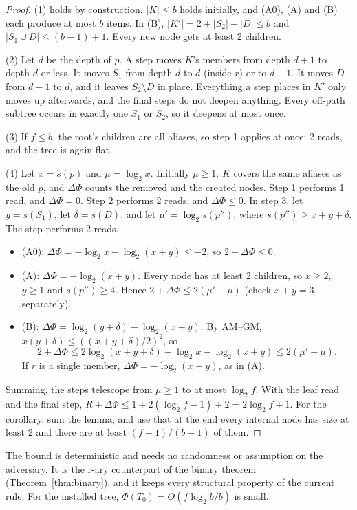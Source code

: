 \documentclass[11pt]{article}
\theoremstyle{definition}
\begin{document}
\begin{proof}
(1) holds by construction. $|K|\le b$ holds initially, and (A0), (A) and (B)
each produce at most $b$ items. In (B), $|K'|=2+|S_2|-|D|\le b$ and
$|S_1\cup D|\le (b-1)+1$. Every new node gets at least 2 children.

(2) Let $d$ be the depth of $p$. A step moves $K$'s members from depth $d+1$
to depth $d$ or less. It moves $S_1$ from depth $d$ to $d$ (inside $r$) or to
$d-1$. It moves $D$ from $d-1$ to $d$, and it leaves $S_2\setminus D$ in
place. Everything a step places in $K'$ only moves up afterwards, and the
final steps do not deepen anything. Every off-path subtree occurs in exactly
one $S_1$ or $S_2$, so it deepens at most once.

(3) If $f\le b$, the root's children are all aliases, so step 1 applies at
once: 2 reads, and the tree is again flat.

(4) Let $x=s(p)$ and $\mu=\log_2 x$. Initially $\mu\ge1$. $K$ covers the same
aliases as the old $p$, and $\Delta\Phi$ counts the removed and the created
nodes. Step 1 performs 1 read, and $\Delta\Phi=0$. Step 2 performs 2 reads,
and $\Delta\Phi\le0$. In step 3, let $y=s(S_1)$, let $\delta=s(D)$, and let
$\mu'=\log_2 s(p'')$, where $s(p'')\ge x+y+\delta$. The step performs 2 reads.
\begin{itemize}
\item (A0): $\Delta\Phi=-\log_2x-\log_2(x+y)\le -2$, so $2+\Delta\Phi\le0$.
\item (A): $\Delta\Phi=-\log_2(x+y)$. Every node has at least 2 children, so
  $x\ge2$, $y\ge1$ and $s(p'')\ge4$. Hence $2+\Delta\Phi\le2(\mu'-\mu)$ (check
  $x+y=3$ separately).
\item (B): $\Delta\Phi=\log_2(y+\delta)-\log_2(x+y)$. By AM--GM,
  $x(y+\delta)\le((x+y+\delta)/2)^2$, so
  \[
  2+\Delta\Phi\le 2\log_2(x+y+\delta)-\log_2x-\log_2(x+y)\le2(\mu'-\mu).
  \]
  If $r$ is a single member, $\Delta\Phi=-\log_2(x+y)$, as in (A).
\end{itemize}
Summing, the steps telescope from $\mu\ge1$ to at most $\log_2 f$. With the
leaf read and the final step, $R+\Delta\Phi\le 1+2(\log_2f-1)+2=2\log_2 f+1$.
For the corollary, sum the lemma, and use that at the end every internal node
has size at least 2 and there are at least $(f-1)/(b-1)$ of them.
\end{proof}

The bound is deterministic and needs no randomness or assumption on the
adversary. It is the r-ary counterpart of the binary theorem
(Theorem~\ref{thm:binary}), and it keeps every structural property of the
current rule. For the installed tree, $\Phi(T_0)=O(f\log_2 b/b)$ is small.
\end{document}
